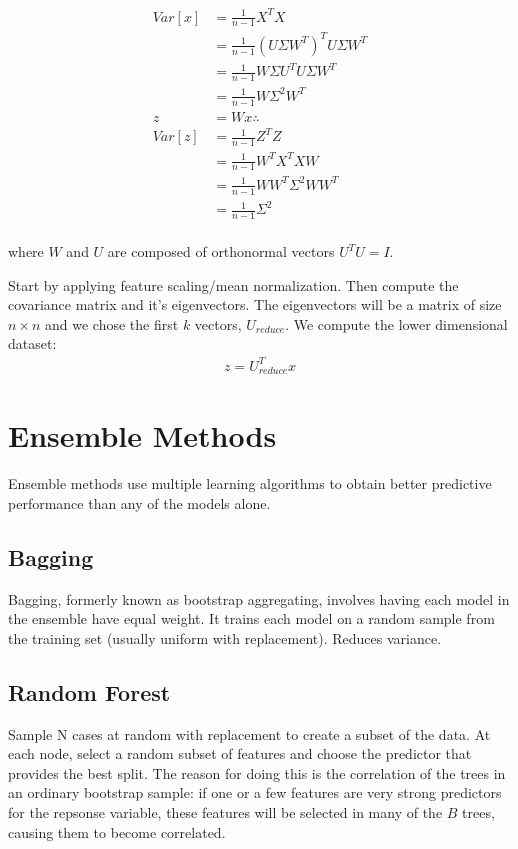\documentclass[12pt]{article}
\begin{document}
\begin{&itemize}
\begin{align*}
Var[x] & = \frac{1}{n-1}X^TX \\
& =  \frac{1}{n-1}(U\Sigma W^T)^TU\Sigma W^T \\
& =  \frac{1}{n-1}W\Sigma U^TU\Sigma W^T \\
& =  \frac{1}{n-1}W\Sigma^2 W^T \\
z &= Wx\therefore \\
Var[z] &= \frac{1}{n-1}Z^TZ \\
& = \frac{1}{n-1}W^TX^TXW \\
& = \frac{1}{n-1}WW^T\Sigma^2WW^T \\
& = \frac{1}{n-1}\Sigma^2 \\
\end{align*}

where $W$ and $U$ are composed of orthonormal vectors $U^TU=I$.  

Start by applying feature scaling/mean normalization. Then compute the covariance matrix and it's eigenvectors. The eigenvectors will be a matrix of size $n\times n$ and we chose the first $k$ vectors, $U_{reduce}$. We compute the lower dimensional dataset:
\begin{align*}
z = U_{reduce}^Tx
\end{align*}

\section{Ensemble Methods}
Ensemble methods use multiple learning algorithms to obtain better predictive performance than any of the models alone.

\subsection{Bagging}
Bagging, formerly known as bootstrap aggregating, involves having each model in the ensemble have equal weight. It trains each model on a random sample from the training set (usually uniform with replacement). Reduces variance.

\subsection{Random Forest}
Sample N cases at random with replacement to create a subset of the data. At each node, select a random subset of features and choose the predictor that provides the best split. The reason for doing this is the correlation of the trees in an ordinary bootstrap sample: if one or a few features are very strong predictors for the repsonse variable, these features will be selected in many of the $B$ trees, causing them to become correlated.


\end{&itemize}
\end{document}

